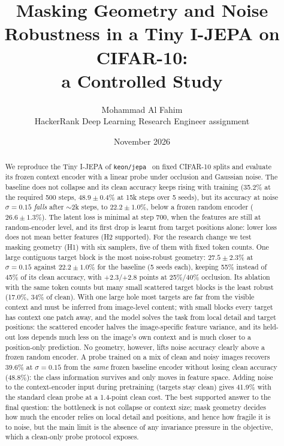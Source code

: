 \documentclass[10pt]{article}
\title{\vspace{-1.2cm}Masking Geometry and Noise Robustness in a Tiny I-JEPA on CIFAR-10:\\
a Controlled Study\vspace{-0.2cm}}
\author{Mohammad Al Fahim \\ \small HackerRank Deep Learning Research Engineer assignment}
\date{\small November 2026}
\begin{document}
\maketitle
\vspace{-0.6cm}

\begin{abstract}
\noindent
We reproduce the Tiny I-JEPA of \texttt{keon/jepa}~\cite{keon2023jepa} on fixed CIFAR-10 splits and evaluate its frozen
context encoder with a linear probe under occlusion and Gaussian noise. The baseline does not collapse and its clean accuracy
keeps rising with training (35.2\% at the required 500 steps, $48.9{\pm}0.4$\% at 15k steps over 5 seeds), but its accuracy at
noise $\sigma{=}0.15$ \emph{falls} after $\sim$2k steps, to $22.2{\pm}1.0$\%, below a frozen random encoder ($26.6{\pm}1.3$\%).
The latent loss is minimal at step 700, when the features are still at random-encoder level, and its first drop is learnt
from target positions alone: lower loss does not mean better features (H2 supported). For the research change we test masking
geometry (H1) with six samplers, five of them with fixed token counts. One large contiguous target block is the
most noise-robust geometry: $27.5{\pm}2.3$\% at $\sigma{=}0.15$ against $22.2{\pm}1.0$\% for the baseline (5 seeds each),
keeping 55\% instead of 45\% of its clean accuracy, with +2.3/+2.8 points at 25\%/40\% occlusion. Its ablation with the
same token counts but many small scattered target blocks is the least robust (17.0\%, 34\% of clean). With one large hole
most targets are far from the visible context and must be inferred from image-level content; with small blocks every target
has context one patch away, and the model solves the task from local detail and target positions: the scattered encoder
halves the image-specific feature variance, and its held-out loss depends much less on the image's own context and is much
closer to a position-only prediction. No geometry, however, lifts noise accuracy clearly above a frozen random encoder. A probe trained on a mix of clean and noisy images recovers 39.6\% at $\sigma{=}0.15$ from the \emph{same} frozen
baseline encoder without losing clean accuracy (48.8\%): the class information survives and only moves in feature space. Adding noise to the context-encoder input
during pretraining (targets stay clean) gives 41.9\% with the standard clean probe at a 1.4-point clean cost. The best
supported answer to the final question: the bottleneck is not collapse or context size; mask geometry decides how much the
encoder relies on local detail and positions, and hence how fragile it is to noise, but the main limit is the absence of any
invariance pressure in the objective, which a clean-only probe protocol exposes.
\end{abstract}
\end{document}
